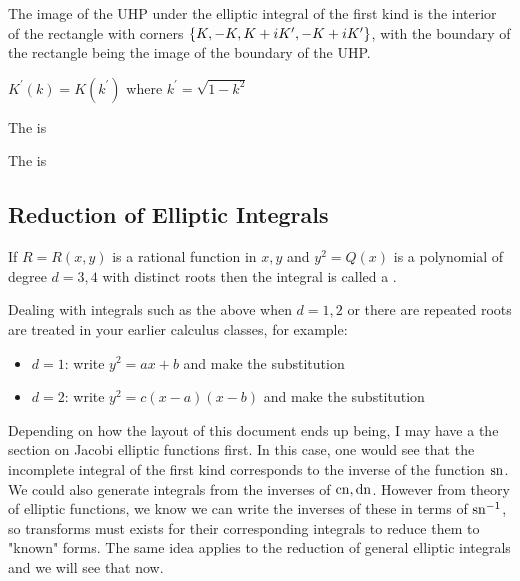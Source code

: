 \documentclass{article}
\begin{document}
\begin{corollary}
	The image of the UHP under the elliptic integral of the first kind is the interior of the rectangle with corners $\left\{ K,-K,K+iK^\prime, -K+iK^\prime \right\}$, with the boundary of the rectangle being the image of the boundary of the UHP.
\end{corollary}

\begin{prop}
	$K^\prime(k) = K(k^\prime)$ where $k^\prime = \sqrt{1-k^2}$
\end{prop}



\begin{definition}
	The  is 
\end{definition}

\begin{definition}
	The  is
\end{definition}

\subsection{Reduction of Elliptic Integrals}

\begin{definition}
	If $R=R(x,y)$ is a rational function in $x,y$ and $y^2=Q(x)$ is a polynomial of degree $d=3,4$ with distinct roots then the integral
is called a . 
\end{definition}

\begin{remark}
	Dealing with integrals such as the above when $d=1,2$ or there are repeated roots are treated in your earlier calculus classes, for example:
	\begin{itemize}
		\item $d=1$: write $y^2 = ax+b$ and make the substitution 
		\item $d=2$: write $y^2 = c(x-a)(x-b)$ and make the substitution 
	\end{itemize}
\end{remark}

\begin{remark}
	Depending on how the layout of this document ends up being, I may have a the section on Jacobi elliptic functions first. In this case, one would see that the incomplete integral of the first kind corresponds to the inverse of the function $\operatorname{sn}$. We could also generate integrals from the inverses of $\operatorname{cn}, \operatorname{dn}$. However from theory of elliptic functions, we know we can write the inverses of these in terms of $\operatorname{sn}^{-1}$, so transforms must exists for their corresponding integrals to reduce them to "known" forms. The same idea applies to the reduction of general elliptic integrals and we will see that now. 
\end{remark}
\end{document}
